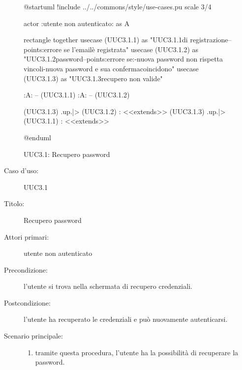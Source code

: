 \documentclass[casi-duso]{subfiles}
\begin{document}
\begin{figure}[h!]
  \centering
  \begin{plantuml}
  @startuml
  !include ../../commons/style/use-cases.pu
  scale 3/4

  actor :utente non autenticato: as A

  rectangle {
    together {
      usecase (UUC3.1.1) as "UUC3.1.1\nInserimento\nemail di registrazione\n--\nExtension points:\nVisualizzazione errore se l'email\nnon è registrata"
      usecase (UUC3.1.2) as "UUC3.1.2\nReimpostazione password\n--\nExtension points:\nVisualizzazione errore se:\n-nuova password non rispetta vincoli\n-nuova password e sua conferma\nnon coincidono"
      usecase (UUC3.1.3) as "UUC3.1.3\nInformazioni recupero non valide"
    }
  }

  :A: -- (UUC3.1.1)
  :A: -- (UUC3.1.2)

  (UUC3.1.3) .up.|> (UUC3.1.2) : <<extends>>
  (UUC3.1.3) .up.|> (UUC3.1.1) : <<extends>>

  @enduml
  \end{plantuml}
  \caption{UUC3.1: Recupero password}
  \label{fig:uuc3_1}
\end{figure}

\begin{description}
  \item[Caso d’uso:] UUC3.1
  \item[Titolo:] Recupero password
  \item[Attori primari:] utente non autenticato
  \item[Precondizione:] l'utente si trova nella schermata di recupero credenziali.
  \item[Postcondizione:] l'utente ha recuperato le credenziali e può nuovamente autenticarsi.
  \item[Scenario principale:]
        \begin{enumerate}
          \item tramite questa procedura, l'utente ha la possibilità di recuperare la password.
        \end{enumerate}
\end{description}

\end{document}
